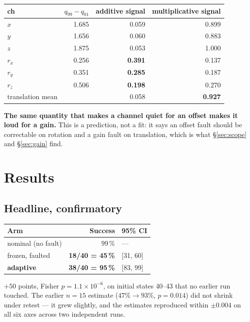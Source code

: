 \documentclass[11pt,a4paper]{article}
\begin{document}
\begin{center}
\begin{tabular}{lrrr}
\toprule
\textbf{ch} & $q_{99}-q_{01}$ & \textbf{additive signal} & \textbf{multiplicative signal} \\
\midrule
$x$  & 1.685 & 0.059 & 0.899 \\
$y$  & 1.656 & 0.060 & 0.883 \\
$z$  & 1.875 & 0.053 & 1.000 \\
$r_x$ & 0.256 & \textbf{0.391} & 0.137 \\
$r_y$ & 0.351 & \textbf{0.285} & 0.187 \\
$r_z$ & 0.506 & \textbf{0.198} & 0.270 \\
\midrule
translation mean & & 0.058 & \textbf{0.927} \\
\bottomrule
\end{tabular}
\end{center}

\textbf{The same quantity that makes a channel quiet for an offset makes it loud
for a gain.} This is a prediction, not a fit: it says an offset fault should be
correctable on rotation and a gain fault on translation, which is what
\S\ref{sec:scope} and \S\ref{sec:gain} find.

\section{Results}
\label{sec:results}

\subsection{Headline, confirmatory}

\begin{center}
\begin{tabular}{lrl}
\toprule
\textbf{Arm} & \textbf{Success} & \textbf{95\% CI} \\
\midrule
nominal (no fault) & 99\,\% & --- \\
frozen, faulted    & \textbf{18/40 = 45\,\%} & [31, 60] \\
\textbf{adaptive}  & \textbf{38/40 = 95\,\%} & [83, 99] \\
\bottomrule
\end{tabular}
\end{center}

$+50$ points, Fisher $p = 1.1\times 10^{-6}$, on initial states 40--43 that no
earlier run touched. The earlier $n{=}15$ estimate ($47\% \to 93\%$, $p = 0.014$)
did not shrink under retest --- it grew slightly, and the estimates reproduced
within $\pm 0.004$ on all six axes across two independent runs.
\end{document}
